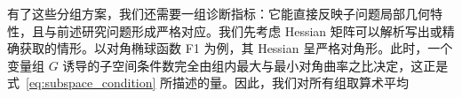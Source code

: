 有了这些分组方案，我们还需要一组诊断指标：它能直接反映子问题局部几何特性，且与前述研究问题形成严格对应。我们先考虑 Hessian 矩阵可以解析写出或精确获取的情形。以对角椭球函数 F1 为例，其 Hessian 呈严格对角形。此时，一个变量组 $G$ 诱导的子空间条件数完全由组内最大与最小对角曲率之比决定，这正是式~\eqref{eq:subspace_condition} 所描述的量。因此，我们对所有组取算术平均